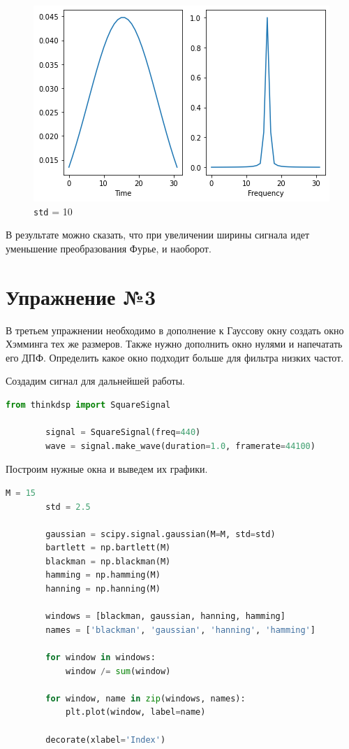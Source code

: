 \documentclass[a4paper, 14pt]{extarticle}
\begin{document}
    \begin{figure}[H]
        \centering
        \includegraphics[width=0.8\linewidth]{DTF_10}
        \caption{\texttt{std} = 10}
        \label{fig:DTF_10}
    \end{figure}

    В результате можно сказать, что при увеличении ширины сигнала идет уменьшение преобразования Фурье, и наоборот.

    \newpage


    \section{Упражнение №3}
    \label{sec:3}

    В третьем упражнении необходимо в дополнение к Гауссову окну создать окно Хэмминга тех же размеров.
    Также нужно дополнить окно нулями и напечатать его ДПФ.
    Определить какое окно подходит больше для фильтра низких частот.

    Создадим сигнал для дальнейшей работы.

    \begin{lstlisting}[language=Python, caption= Создание сигнала, label={lst:make_signal}]
        from thinkdsp import SquareSignal

        signal = SquareSignal(freq=440)
        wave = signal.make_wave(duration=1.0, framerate=44100)
    \end{lstlisting}

    Построим нужные окна и выведем их графики.

    \begin{lstlisting}[language=Python, caption= Построение окон, label={lst:make_window}]
        M = 15
        std = 2.5

        gaussian = scipy.signal.gaussian(M=M, std=std)
        bartlett = np.bartlett(M)
        blackman = np.blackman(M)
        hamming = np.hamming(M)
        hanning = np.hanning(M)

        windows = [blackman, gaussian, hanning, hamming]
        names = ['blackman', 'gaussian', 'hanning', 'hamming']

        for window in windows:
            window /= sum(window)

        for window, name in zip(windows, names):
            plt.plot(window, label=name)

        decorate(xlabel='Index')
    \end{lstlisting}
\end{document}
